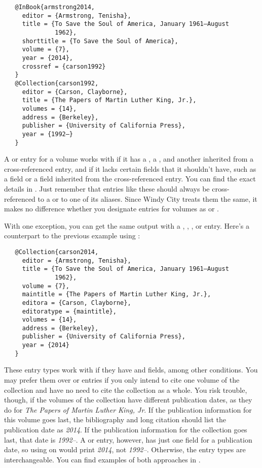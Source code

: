 \documentclass[11pt,letterpaper,oneside]{article}
\begin{document}
\begin{verbatim}
   @InBook{armstrong2014,
     editor = {Armstrong, Tenisha},
     title = {To Save the Soul of America, January 1961–August
              1962},
     shorttitle = {To Save the Soul of America},
     volume = {7},
     year = {2014},
     crossref = {carson1992}
   }
   @Collection{carson1992,
     editor = {Carson, Clayborne},
     title = {The Papers of Martin Luther King, Jr.},
     volumes = {14},
     address = {Berkeley},
     publisher = {University of California Press},
     year = {1992–}
   }
\end{verbatim}

A  or  entry for a volume works
with  if it has a , a ,
and another  inherited from a cross-referenced entry,
and if it lacks certain fields that it shouldn't have, such as a
 field or a  field inherited from
the cross-referenced entry. You can find the exact details in
. Just remember that entries like these should
always be cross-referenced to a  or to one of its
aliases. Since Windy City treats them the same, it makes no difference
whether you designate entries for volumes as  or
.

With one exception, you can get the same output with a ,
, , or 
entry. Here's a counterpart to the previous example using
:

\begin{verbatim}
   @Collection{carson2014,
     editor = {Armstrong, Tenisha},
     title = {To Save the Soul of America, January 1961–August
              1962},
     volume = {7},
     maintitle = {The Papers of Martin Luther King, Jr.},
     editora = {Carson, Clayborne},
     editoratype = {maintitle},
     volumes = {14},
     address = {Berkeley},
     publisher = {University of California Press},
     year = {2014}
   }
\end{verbatim}

These entry types work with  if they have
 and  fields, among other
conditions. You may prefer them over  or
 entries if you only intend to cite one volume of the
collection and have no need to cite the collection as a whole. You
risk trouble, though, if the volumes of the collection have different
publication dates, as they do for \textit{The Papers of Martin Luther
King, Jr}. If the publication information for this volume goes last,
the bibliography and long citation should list the publication date as
\textit{2014}. If the publication information for the collection goes
last, that date is \textit{1992–}. A  or
 entry, however, has just one field for a
publication date, so using  on 
would print \textit{2014}, not \textit{1992–}. Otherwise, the entry
types are interchangeable. You can find examples of both approaches in
.
\end{document}
